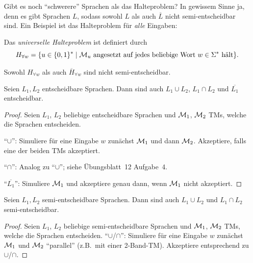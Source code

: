 \begin{Bemerkung}
	Gibt es noch "`schwerere"' Sprachen als das Halteproblem?
	In gewissem Sinne ja, denn es gibt Sprachen $L$, sodass sowohl $L$ als auch $\overline{L}$ nicht semi-entscheidbar sind.
	Ein Beispiel ist das Halteproblem für \emph{alle} Eingaben:
\end{Bemerkung}


\begin{Def}[name={[Universelles Halteproblem $H_{\forall w}$]}]
	Das \emph{universelle Halteproblem} ist definiert durch
	$$
	H_{\forall w} = \{u\in\{0,1\}^* \mid \text{$\mathcal{M}_u$ angesetzt auf jedes beliebige Wort $w \in \Sigma^*$ hält}\}.
	$$
\end{Def}

\begin{Satz}[name={[Universelles Halteproblem $H_{\forall w}$]}]
	Sowohl $H_{\forall w}$ als auch $\overline{H}_{\forall w}$ sind nicht semi-entscheidbar.
\end{Satz}

\begin{Satz}
	Seien $L_1, L_2$ entscheidbare Sprachen.
	Dann sind auch $L_1 \cup L_2$, $L_1 \cap L_2$ und $\overline{L_1}$ entscheidbar.
\end{Satz}


\begin{proof}
	Seien $L_1$, $L_2$ beliebige entscheidbare Sprachen und $\mathcal{M}_1$, $\mathcal{M}_2$ \ac{TM}s, welche die Sprachen entscheiden.

	"`$\cup$"': Simuliere für eine Eingabe $w$ zunächst $\mathcal{M}_1$ und dann $\mathcal{M}_2$.
	Akzeptiere, falls eine der beiden \ac{TM}s akzeptiert.

	"`$\cap$"': Analog zu "`$\cup$"'; siehe Übungsblatt~12 Aufgabe~4.

	"`$\overline{L_1}$"': Simuliere $\mathcal{M}_1$ und akzeptiere genau dann, wenn $\mathcal{M}_1$ nicht akzeptiert.
\end{proof}

\begin{Satz}\label{satz:SemidetCupCap}
	Seien $L_1, L_2$ semi-entscheidbare Sprachen.
	Dann sind auch $L_1 \cup L_2$ und $L_1 \cap L_2$ semi-entscheidbar.
\end{Satz}


\begin{proof}
	Seien $L_1$, $L_2$ beliebige semi-entscheidbare Sprachen und $\mathcal{M}_1$, $\mathcal{M}_2$ \ac{TM}s, welche die Sprachen entscheiden.
	"`$\cup$/$\cap$"': Simuliere für eine Eingabe $w$ zunächst $\mathcal{M}_1$ und $\mathcal{M}_2$ "`parallel"' (z.B.\ mit einer 2-Band-\ac{TM}).
	Akzeptiere entsprechend zu $\cup$/$\cap$.
\end{proof}


